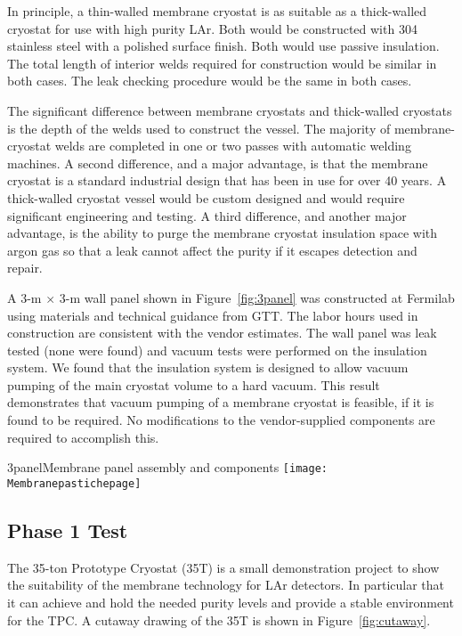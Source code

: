 In principle, a thin-walled membrane cryostat is as suitable as a thick-walled cryostat for use with high purity LAr. Both would be constructed with 304 stainless steel with a polished surface finish. Both would use passive insulation. The total length of interior welds required for construction would be similar in both cases. The leak checking procedure would be the same in both cases.

The significant difference between membrane cryostats and thick-walled cryostats is the depth of the welds used to construct the vessel.  The majority of membrane-cryostat welds are completed in one or two passes with automatic welding machines. A second difference, and a major advantage, is that the membrane cryostat is a standard industrial design that has been in use for over 40 years. A thick-walled cryostat vessel would be custom designed and would require significant engineering and testing. A third difference, and another major advantage, is the ability to purge the membrane cryostat insulation space with argon gas so that a leak cannot affect the purity if it escapes detection and repair. 

A 3-m $\times$ 3-m wall panel shown in Figure~\ref{fig:3panel} was constructed at Fermilab using materials and technical guidance from GTT. The labor hours used in construction are consistent with the vendor estimates. The wall panel was leak tested (none were found) and vacuum tests were performed on the insulation system. We found that the insulation system is designed to allow vacuum pumping of the main cryostat volume to a hard vacuum. This result demonstrates that vacuum pumping of a membrane cryostat is feasible, if it is found to be required. No modifications to the vendor-supplied components are required to accomplish this.


\begin{cdrfigure}{3panel}{Membrane panel assembly and components}
\texttt{[image: Membranepastichepage]}
\end{cdrfigure}


\subsection{Phase 1 Test}

The 35-ton Prototype Cryostat (35T) is a small demonstration project to show the suitability of the 
membrane technology for LAr detectors. In particular that it can achieve and hold the needed purity 
levels and provide a stable environment for the TPC. A cutaway drawing of the 35T is shown in 
Figure~\ref{fig:cutaway}.


